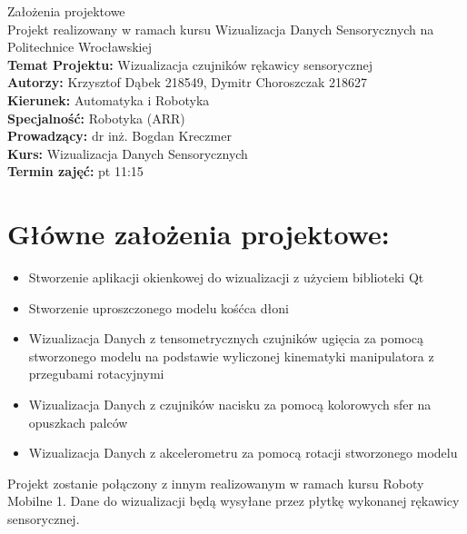 \documentclass[12pt,a4paper]{article}
\begin{document}
\LARGE\centering Założenia projektowe\\
\large\centering Projekt realizowany w ramach kursu Wizualizacja Danych Sensorycznych na Politechnice Wrocławskiej\\
\vspace{5 mm}
\normalsize\flushleft\textbf{Temat Projektu:} Wizualizacja czujników rękawicy sensorycznej\\
\textbf{Autorzy:} Krzysztof Dąbek 218549, Dymitr Choroszczak 218627\\
\textbf{Kierunek:} Automatyka i Robotyka\\
\textbf{Specjalność:} Robotyka (ARR)\\
\textbf{Prowadzący:} dr inż. Bogdan Kreczmer\\
\textbf{Kurs:} Wizualizacja Danych Sensorycznych\\
\textbf{Termin zajęć:} pt 11:15\\
\vspace{5 mm}

\section{Główne założenia projektowe:}
\begin{itemize}
\item Stworzenie aplikacji okienkowej do wizualizacji z użyciem biblioteki Qt
\item Stworzenie uproszczonego modelu kośćca dłoni
\item Wizualizacja Danych z tensometrycznych czujników ugięcia za pomocą stworzonego modelu na podstawie wyliczonej kinematyki manipulatora z przegubami rotacyjnymi
\item Wizualizacja Danych z czujników nacisku za pomocą kolorowych sfer na opuszkach palców
\item Wizualizacja Danych z akcelerometru za pomocą rotacji stworzonego modelu
\end{itemize}
Projekt zostanie połączony z innym realizowanym w ramach kursu Roboty Mobilne 1. Dane do wizualizacji będą wysyłane przez płytkę wykonanej rękawicy sensorycznej.
\end{document}
